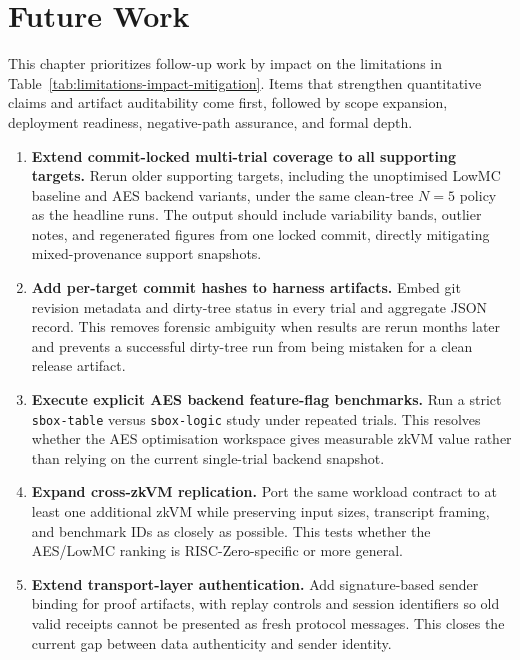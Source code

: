 \chapter{Future Work}

{\small
This chapter prioritizes follow-up work by impact on the limitations in
Table~\ref{tab:limitations-impact-mitigation}. Items that strengthen quantitative
claims and artifact auditability come first, followed by scope expansion,
deployment readiness, negative-path assurance, and formal depth.

\begin{enumerate}
\setlength{\itemsep}{2pt}
\setlength{\parskip}{0pt}
\item \textbf{Extend commit-locked multi-trial coverage to all supporting targets.}
Rerun older supporting targets, including the unoptimised LowMC baseline and AES
backend variants, under the same clean-tree \(N=5\) policy as the headline runs.
The output should include variability bands, outlier notes, and regenerated
figures from one locked commit, directly mitigating mixed-provenance support
snapshots.

\item \textbf{Add per-target commit hashes to harness artifacts.}
Embed git revision metadata and dirty-tree status in every trial and aggregate
JSON record. This removes forensic ambiguity when results are rerun months later
and prevents a successful dirty-tree run from being mistaken for a clean release
artifact.

\item \textbf{Execute explicit AES backend feature-flag benchmarks.}
Run a strict \texttt{sbox-table} versus \texttt{sbox-logic} study under repeated
trials. This resolves whether the AES optimisation workspace gives measurable
zkVM value rather than relying on the current single-trial backend snapshot.

\item \textbf{Expand cross-zkVM replication.}
Port the same workload contract to at least one additional zkVM while preserving
input sizes, transcript framing, and benchmark IDs as closely as possible. This
tests whether the AES/LowMC ranking is RISC-Zero-specific or more general.

\item \textbf{Extend transport-layer authentication.}
Add signature-based sender binding for proof artifacts, with replay controls and
session identifiers so old valid receipts cannot be presented as fresh protocol
messages. This closes the current gap between data authenticity and sender
identity.


\end{enumerate}}
